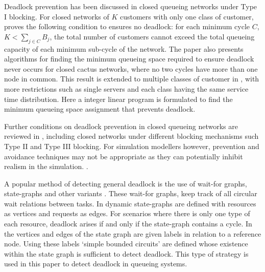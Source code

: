 \documentclass{article}
\numberwithin{equation}{section}
\begin{document}
Deadlock prevention has been discussed in closed queueing networks under Type I blocking.
For closed networks of $K$ customers with only one class of customer, \cite{kunduakyildiz89} proves the following condition to ensures no deadlock: for each minimum cycle $C$, $K < \sum_{j\in C} B_j$, the total number of customers cannot exceed the total queueing capacity of each minimum sub-cycle of the network.
The paper also presents algorithms for finding the minimum queueing space required to ensure deadlock never occurs for closed cactus networks, where no two cycles have more than one node in common.
This result is extended to multiple classes of customer in \cite{liebeherrakyildiz95}, with more restrictions such as single servers and each class having the same service time distribution.
Here a integer linear program is formulated to find the minimum queueing space assignment that prevents deadlock.

Further conditions on deadlock prevention in closed queueing networks are reviewed in \cite{onvural90}, including closed networks under different blocking mechanisms such Type II and Type III blocking.
For simulation modellers however, prevention and avoidance techniques may not be appropriate as they can potentially inhibit realism in the simulation. \cite{venkateshetal98}.

A popular method of detecting general deadlock is the use of wait-for graphs, state-graphs and other variants \cite{cheng90, elmagarmid86, coffmanelphick71, choetal95, deuermeyeretal97, venkateshetal98, venkateshsmith03, venkateshsmith05, hotl72}.
These wait-for graphs, keep track of all circular wait relations between tasks.
In \cite{coffmanelphick71} dynamic state-graphs are defined with resources as vertices and requests as edges.
For scenarios where there is only one type of each resource, deadlock arises if and only if the state-graph contains a cycle.
In \cite{choetal95} the vertices and edges of the state graph are given labels in relation to a reference node.
Using these labels `simple bounded circuits' are defined whose existence within the state graph is sufficient to detect deadlock.
This type of strategy is used in this paper to detect deadlock in queueing systems.
\end{document}
